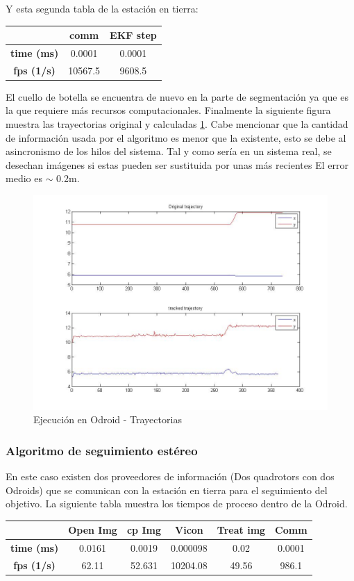 	Y esta segunda tabla de la estaci\'on en tierra:
	\newline
	
	{
	\centering
		\begin{tabular}{|c|c|c|}
		\hline  					&  comm		&  EKF step	\\
		\hline  \textbf{time (ms)}	& 	0.0001	& 	0.0001	\\
		\hline  \textbf{fps (1/s)}	&  	10567.5	&  	9608.5	\\
		\hline 
		\end{tabular} 
	}
	\newline
	
	El cuello de botella se encuentra de nuevo en la parte de segmentaci\'on ya que es la que requiere m\'as recursos computacionales.
	Finalmente la siguiente figura muestra las trayectorias original y calculadas \ref{fig:arch_trajs}. Cabe mencionar que la cantidad de informaci\'on usada por el algoritmo es menor que la existente, esto se debe al asincronismo de los hilos del sistema. Tal y como ser\'ia en un sistema real, se desechan im\'agenes si estas pueden ser sustituida por unas m\'as recientes El error medio es $\sim$ 0.2m.
	
	\begin{figure}[ph]
		\centering
		\includegraphics[width=0.5\linewidth]{../Images/c4/arch_trajs}
		\caption{Ejecuci\'on en Odroid - Trayectorias}
		\label{fig:arch_trajs}
	\end{figure}

	
	\subsubsection{Algoritmo de seguimiento est\'ereo}
		En este caso existen dos proveedores de informaci\'on (Dos quadrotors con dos Odroids) que se comunican con la estaci\'on en tierra para el seguimiento del objetivo. La siguiente tabla muestra los tiempos de proceso dentro de la Odroid.
		\newline
		\newline
		{
		\centering
			\begin{tabular}{|c|c|c|c|c|c|}
			\hline  					&  Open Img	&  cp Img 	& Vicon 	& Treat img & Comm  		\\ 
			\hline  \textbf{time (ms)}	& 	0.0161	& 0.0019	&	0.000098&  	 0.02	&	0.0001		\\ 
			\hline  \textbf{fps (1/s)}	&  	62.11	&  52.631	& 10204.08 	&  49.56	&	986.1	\\ 
			\hline 
			\end{tabular} 
		}
		\newline
		
